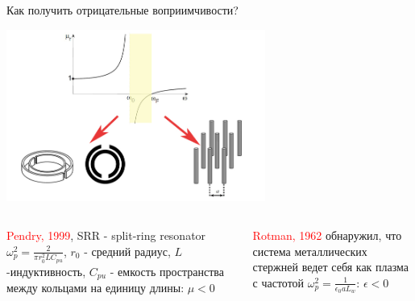 \documentclass[9pt, compress, xcolor=table]{beamer}
\begin{document}

\begin{frame}{Как получить отрицательные воприимчивости?}
\begin{center}
\includegraphics[width=8.5cm]{neg_ref_7d}
\end{center}
\begin{columns}[c]
\column{5.5cm} \begin{block} {\scriptsize \textcolor{red}{Pendry, 1999}, SRR - split-ring resonator
$\omega_p^2 = \frac{2}{\pi r_0^2 L C_{pu}}$, $r_0$ - средний радиус, $L$ -индуктивность, $C_{pu}$ -
емкость пространства между кольцами на единицу длины: $\mu < 0$}\end{block}

\column{5.5cm}\begin{block} {\scriptsize \textcolor{red}{Rotman, 1962} обнаружил, что система
металлических стержней ведет себя как плазма с частотой $\omega_p^2 = \frac{1}{\epsilon_0 a L_w}$:
$\epsilon < 0$}\end{block}
\end{columns}
\end{frame}
\end{document}
